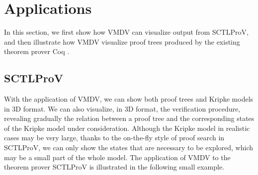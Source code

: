\documentclass[runningheads]{llncs}
\newcommand\tool[1]{\textsf{#1}}
\newcommand\vmdv{\tool{VMDV}}
\begin{document}
 

\section{Applications}
In this section, we first show how \vmdv{} can visualize output from \textsf{SCTLProV}, and then illustrate how \vmdv{} visualize proof trees produced by the existing theorem prover Coq \cite{bertot2013interactive}.
 
\subsection{\textsf{SCTLProV}}
With the application of \textsf{VMDV}, we can show both proof trees and Kripke models in 3D format.
We can also visualize, in 3D format, the verification procedure,
revealing gradually the relation between a proof tree and the corresponding states of the Kripke model under consideration.
Although the Kripke model in realistic cases may be very large, thanks to the on-the-fly style of proof search in \textsf{SCTLProV}, we can only show the states that are necessary to be explored, which may be a small part of the whole model.
The application of \vmdv{} to the theorem prover \textsf{SCTLProV} is illustrated in the following small example.
 
\end{document}

